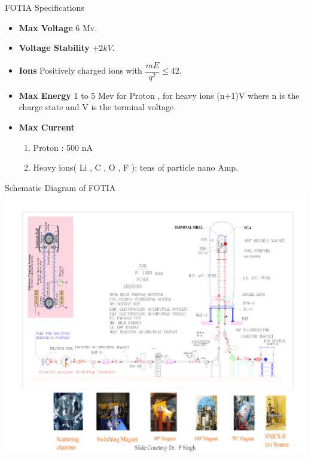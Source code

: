 \documentclass[11pt]{beamer}
\begin{document}
\begin{frame}{FOTIA Specifications}

  \begin{itemize}
   
    \item \textbf{Max Voltage} 6 Mv.
    \item \textbf{Voltage Stability} $\underline{+} 2 kV $.
    \item \textbf{Ions} Positively charged ions with $\dfrac{mE}{q^2}   \leqslant 42$.
    \item \textbf{Max Energy} 1 to 5 Mev for Proton , for heavy ions (n+1)V where n is the charge state and V is the terminal voltage.
    \item \textbf{Max Current} 
    \begin{enumerate}
     \item Proton : 500 nA
     \item Heavy ions( Li , C , O , F ): tens of particle nano Amp.
    \end{enumerate}
      
   \end{itemize}

\end{frame}

\begin{frame}{Schematic Diagram of FOTIA}
\includegraphics[width=\linewidth]{FOTIA_Page_05.jpg}
\end{frame}
\end{document}
